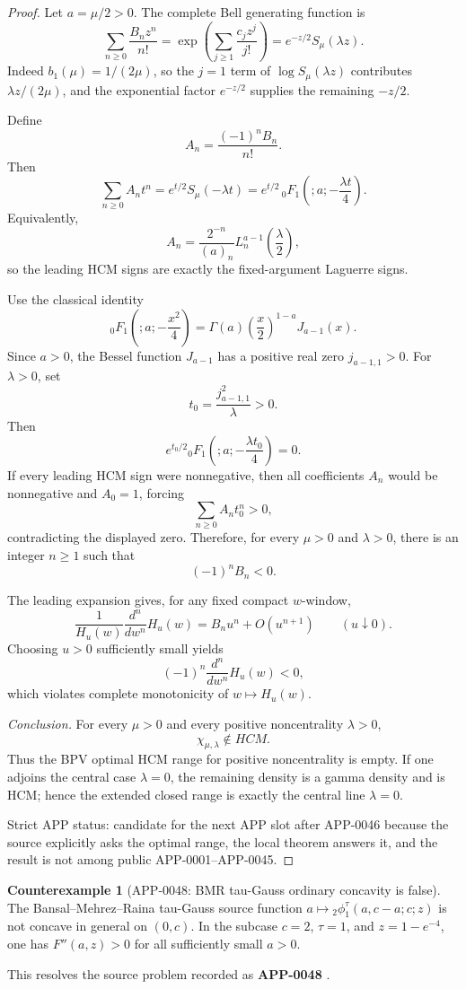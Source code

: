 \documentclass[11pt]{article}
\numberwithin{equation}{section}
\theoremstyle{definition}
\newtheorem{counterexample}[theorem]{Counterexample}
\theoremstyle{remark}
\newcommand{\1}{\mathbf 1}
\begin{document}
\begin{proof}
Let \(a=\mu/2>0\). The complete Bell generating function is
\[
\sum_{n\ge0}\frac{B_nz^n}{n!}
=\exp\left(\sum_{j\ge1}\frac{c_jz^j}{j!}\right)
=e^{-z/2}S_\mu(\lambda z).
\]
Indeed \(b_1(\mu)=1/(2\mu)\), so the \(j=1\) term of \(\log S_\mu(\lambda z)\) contributes \(\lambda z/(2\mu)\), and the exponential factor \(e^{-z/2}\) supplies the remaining \(-z/2\).

Define
\[
A_n=\frac{(-1)^nB_n}{n!}.
\]
Then
\[
\sum_{n\ge0}A_nt^n
=e^{t/2}S_\mu(-\lambda t)
=e^{t/2}\,{}_0F_1\left(;a;-\frac{\lambda t}{4}\right).
\]
Equivalently,
\[
A_n=\frac{2^{-n}}{(a)_n}L_n^{a-1}\left(\frac{\lambda}{2}\right),
\]
so the leading HCM signs are exactly the fixed-argument Laguerre signs.

Use the classical identity
\[
{}_0F_1\left(;a;-\frac{x^2}{4}\right)
=\Gamma(a)\left(\frac{x}{2}\right)^{1-a}J_{a-1}(x).
\]
Since \(a>0\), the Bessel function \(J_{a-1}\) has a positive real zero \(j_{a-1,1}>0\). For \(\lambda>0\), set
\[
t_0=\frac{j_{a-1,1}^2}{\lambda}>0.
\]
Then
\[
e^{t_0/2}{}_0F_1\left(;a;-\frac{\lambda t_0}{4}\right)=0.
\]
If every leading HCM sign were nonnegative, then all coefficients \(A_n\) would be nonnegative and \(A_0=1\), forcing
\[
\sum_{n\ge0}A_nt_0^n>0,
\]
contradicting the displayed zero. Therefore, for every \(\mu>0\) and \(\lambda>0\), there is an integer \(n\ge1\) such that
\[
(-1)^nB_n<0.
\]

The leading expansion gives, for any fixed compact \(w\)-window,
\[
\frac{1}{H_u(w)}\frac{d^n}{dw^n}H_u(w)
=B_nu^n+O(u^{n+1})
\qquad(u\downarrow0).
\]
Choosing \(u>0\) sufficiently small yields
\[
(-1)^n\frac{d^n}{dw^n}H_u(w)<0,
\]
which violates complete monotonicity of \(w\mapsto H_u(w)\).

\emph{Conclusion.}
For every \(\mu>0\) and every positive noncentrality \(\lambda>0\),
\[
\chi_{\mu,\lambda}\notin HCM.
\]
Thus the BPV optimal HCM range for positive noncentrality is empty. If one adjoins the central case \(\lambda=0\), the remaining density is a gamma density and is HCM; hence the extended closed range is exactly the central line \(\lambda=0\).

Strict APP status: candidate for the next APP slot after APP-0046 because the source explicitly asks the optimal range, the local theorem answers it, and the result is not among public APP-0001--APP-0045.
\end{proof}

\begin{counterexample}[APP-0048: BMR tau-Gauss ordinary concavity is false]
\label{res:bmr-tau-gauss-not-globally-concave}
The Bansal--Mehrez--Raina tau-Gauss source function \(a\mapsto {}_2\phi^\tau_1(a,c-a;c;z)\) is not concave in general on \((0,c)\). In the subcase \(c=2\), \(\tau=1\), and \(z=1-e^{-4}\), one has \(F''(a,z)>0\) for all sufficiently small \(a>0\).

This resolves the source problem recorded as \textbf{APP-0048} \cite{app-app-0048-source}.
\end{counterexample}
\end{document}
